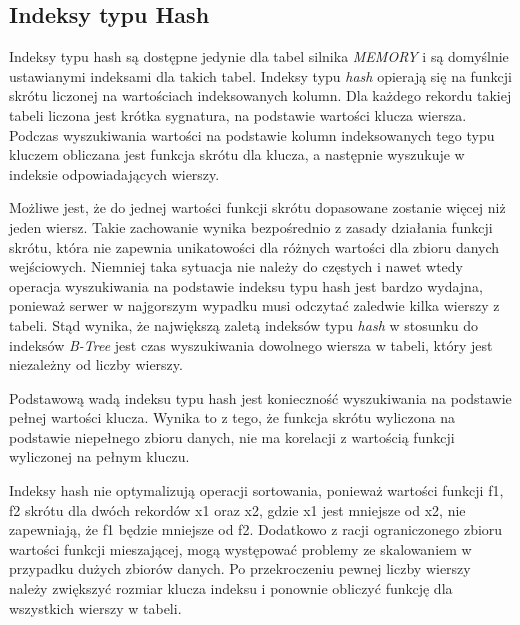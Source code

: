 
\subsection{Indeksy typu Hash}
Indeksy typu hash są dostępne jedynie dla tabel silnika \textit{MEMORY} i są domyślnie ustawianymi indeksami dla takich tabel. Indeksy typu \textit{hash} opierają się na funkcji skrótu liczonej na wartościach indeksowanych kolumn. Dla każdego rekordu takiej tabeli liczona jest krótka sygnatura, na podstawie wartości klucza wiersza. Podczas wyszukiwania wartości na podstawie kolumn indeksowanych tego typu kluczem obliczana jest funkcja skrótu dla klucza, a następnie wyszukuje w indeksie odpowiadających wierszy. 

Możliwe jest, że do jednej wartości funkcji skrótu dopasowane zostanie więcej niż jeden wiersz. Takie zachowanie wynika bezpośrednio z zasady działania funkcji skrótu, która nie zapewnia unikatowości dla różnych wartości dla zbioru danych wejściowych. Niemniej taka sytuacja nie należy do częstych i nawet wtedy operacja wyszukiwania na podstawie indeksu typu hash jest bardzo wydajna, ponieważ serwer w najgorszym wypadku musi odczytać zaledwie kilka wierszy z tabeli. Stąd wynika, że największą zaletą indeksów typu \textit{hash} w stosunku do indeksów \textit{B-Tree} jest czas wyszukiwania dowolnego wiersza w tabeli, który jest niezależny od liczby wierszy. 

Podstawową wadą indeksu typu hash jest konieczność wyszukiwania na podstawie pełnej wartości klucza. Wynika to z tego, że funkcja skrótu wyliczona na podstawie niepełnego zbioru danych, nie ma korelacji z wartością funkcji wyliczonej na pełnym kluczu. 

Indeksy hash nie optymalizują operacji sortowania, ponieważ wartości funkcji f1, f2 skrótu dla dwóch rekordów x1 oraz x2, gdzie x1 jest mniejsze od x2, nie zapewniają, że f1 będzie mniejsze od f2. Dodatkowo z racji ograniczonego zbioru wartości funkcji mieszającej, mogą występować problemy ze skalowaniem w przypadku dużych zbiorów danych. Po przekroczeniu pewnej liczby wierszy należy zwiększyć rozmiar klucza indeksu i ponownie obliczyć funkcję dla wszystkich wierszy w tabeli.
